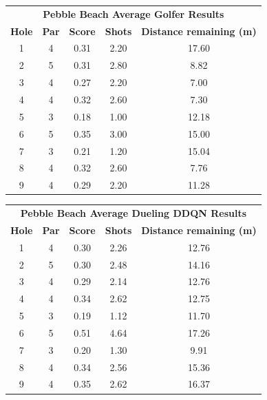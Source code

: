 \documentclass{kththesis}
\begin{document}
\begin{table}
    \begin{subtable}{\textwidth}
    \centering
    \begin{tabular}{c|c|c|c|c}
    \multicolumn{5}{c}{\textbf{Pebble Beach Average Golfer Results}} \\ 
        \textbf{Hole} & \textbf{Par} & \textbf{Score} & \textbf{Shots} & \textbf{Distance remaining (m)}  \\ \hline
        1 & 4 & 0.31 & 2.20 & 17.60 \\ 
        2 & 5 & 0.31 & 2.80 & 8.82 \\ 
        3 & 4 & 0.27 & 2.20 & 7.00 \\ 
        4 & 4 & 0.32 & 2.60 & 7.30 \\ 
        5 & 3 & 0.18 & 1.00 & 12.18 \\ 
        6 & 5 & 0.35 & 3.00 & 15.00 \\ 
        7 & 3 & 0.21 & 1.20 & 15.04 \\ 
        8 & 4 & 0.32 & 2.60 & 7.76 \\ 
        9 & 4 & 0.29 & 2.20 & 11.28 \\
    \end{tabular}
    \end{subtable}
    \hfill
    \begin{subtable}{\textwidth}
    \centering
    \begin{tabular}{c|c|c|c|c}
    \multicolumn{5}{c}{\textbf{Pebble Beach Average Dueling DDQN Results}} \\ 
        \textbf{Hole} & \textbf{Par} & \textbf{Score} & \textbf{Shots} & \textbf{Distance remaining (m)}  \\ \hline
        1 & 4 & 0.30 & 2.26 & 12.76 \\ 
        2 & 5 & 0.30 & 2.48 & 14.16 \\ 
        3 & 4 & 0.29 & 2.14 & 12.76 \\ 
        4 & 4 & 0.34 & 2.62 & 12.75 \\ 
        5 & 3 & 0.19 & 1.12 & 11.70 \\ 
        6 & 5 & 0.51 & 4.64 & 17.26 \\ 
        7 & 3 & 0.20 & 1.30 & 9.91 \\ 
        8 & 4 & 0.34 & 2.56 & 15.36 \\ 
        9 & 4 & 0.35 & 2.62 & 16.37 \\ 
    \end{tabular}
    \end{subtable}
    \hfill

\end{table}
\end{document}
